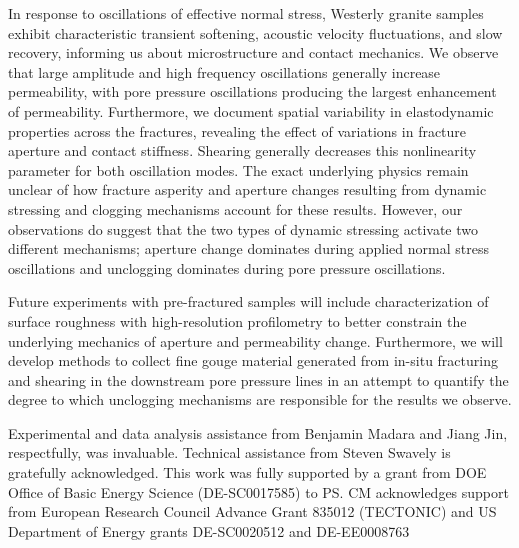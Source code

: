 \documentclass[draft]{agujournal2019}
\begin{document}
In response to oscillations of effective normal stress, Westerly granite samples exhibit characteristic transient softening, acoustic velocity fluctuations, and slow recovery, informing us about microstructure and contact mechanics. We observe that large amplitude and high frequency oscillations generally increase permeability, with pore pressure oscillations producing the largest enhancement of permeability. Furthermore, we document spatial variability in elastodynamic properties across the fractures, revealing the effect of variations in fracture aperture and contact stiffness. Shearing generally decreases this nonlinearity parameter for both oscillation modes.
The exact underlying physics remain unclear of how fracture asperity and aperture changes resulting from dynamic stressing and clogging mechanisms account for these results. However, our observations do suggest that the two types of dynamic stressing activate two different mechanisms; aperture change dominates during applied normal stress oscillations and unclogging dominates during pore pressure oscillations. 

Future experiments with pre-fractured samples will include characterization of surface roughness with high-resolution profilometry to better constrain the underlying mechanics of aperture and permeability change. Furthermore, we will develop methods to collect fine gouge material generated from in-situ fracturing and shearing in the downstream pore pressure lines in an attempt to quantify the degree to which unclogging mechanisms are responsible for the results we observe.



\acknowledgments
Experimental and data analysis assistance from Benjamin Madara and Jiang Jin, respectfully, was invaluable. Technical assistance from Steven Swavely is gratefully acknowledged. This work was fully supported by a grant from DOE Office of Basic Energy Science (DE-SC0017585) to PS. CM acknowledges support from European Research Council Advance Grant 835012 (TECTONIC) and US Department of Energy grants DE-SC0020512 and DE-EE0008763



%
%
\end{document}
